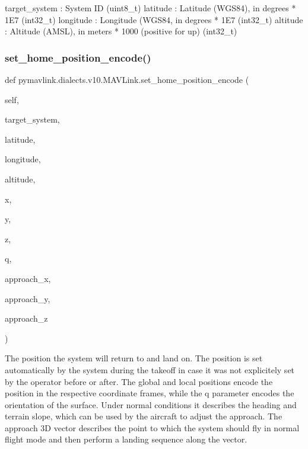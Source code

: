 \begin{DoxyVerb}
\begin{DoxyVerb}
\begin{DoxyVerb}
\begin{DoxyVerb}
\begin{DoxyVerb}
\begin{DoxyVerb}
\begin{DoxyVerb}
\begin{DoxyVerb}
\begin{DoxyVerb}
\begin{DoxyVerb}
\begin{DoxyVerb}
target_system             : System ID (uint8_t)
latitude                  : Latitude (WGS84), in degrees * 1E7 (int32_t)
longitude                 : Longitude (WGS84, in degrees * 1E7 (int32_t)
altitude                  : Altitude (AMSL), in meters * 1000 (positive for up) (int32_t)\end{DoxyVerb}
 \mbox{\label{classpymavlink_1_1dialects_1_1v10_1_1MAVLink_af70df46be3e9f279df905a1c32defd70}} 
\subsubsection{\texorpdfstring{set\+\_\+home\+\_\+position\+\_\+encode()}{set\_home\_position\_encode()}}
{\footnotesize\ttfamily def pymavlink.\+dialects.\+v10.\+M\+A\+V\+Link.\+set\+\_\+home\+\_\+position\+\_\+encode (\begin{DoxyParamCaption}\item[{}]{self,  }\item[{}]{target\+\_\+system,  }\item[{}]{latitude,  }\item[{}]{longitude,  }\item[{}]{altitude,  }\item[{}]{x,  }\item[{}]{y,  }\item[{}]{z,  }\item[{}]{q,  }\item[{}]{approach\+\_\+x,  }\item[{}]{approach\+\_\+y,  }\item[{}]{approach\+\_\+z }\end{DoxyParamCaption})}

\begin{DoxyVerb}The position the system will return to and land on. The position is
set automatically by the system during the takeoff in
case it was not explicitely set by the operator before
or after. The global and local positions encode the
position in the respective coordinate frames, while
the q parameter encodes the orientation of the
surface. Under normal conditions it describes the
heading and terrain slope, which can be used by the
aircraft to adjust the approach. The approach 3D
vector describes the point to which the system should
fly in normal flight mode and then perform a landing
sequence along the vector.


\end{DoxyVerb}
\end{DoxyVerb}
\end{DoxyVerb}
\end{DoxyVerb}
\end{DoxyVerb}
\end{DoxyVerb}
\end{DoxyVerb}
\end{DoxyVerb}
\end{DoxyVerb}
\end{DoxyVerb}
\end{DoxyVerb}
